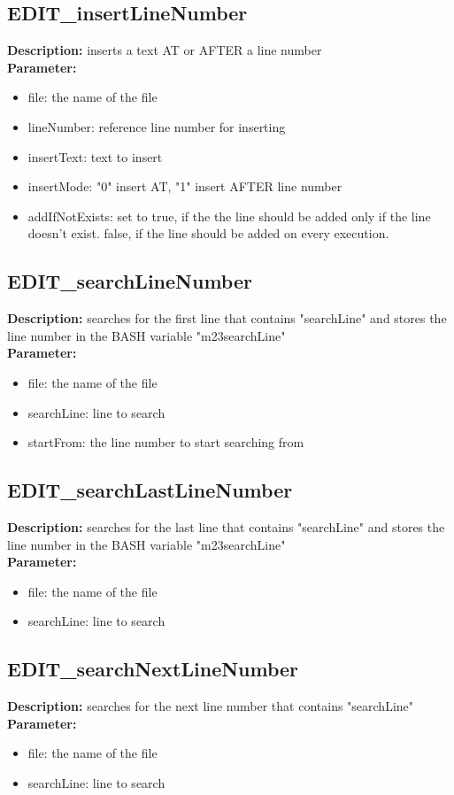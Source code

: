 \subsection{EDIT\_insertLineNumber}
\textbf{Description:} inserts a text AT or AFTER a line number\\
\textbf{Parameter:}
\begin{itemize}
\item file: the name of the file
\item lineNumber: reference line number for inserting
\item insertText: text to insert
\item insertMode: "0" insert AT, "1" insert AFTER line number
\item addIfNotExists: set to true, if the the line should be added only if the line doesn't exist. false, if the line should be added on every execution.
\end{itemize}

\subsection{EDIT\_searchLineNumber}
\textbf{Description:} searches for the first line that contains "searchLine" and stores the line number in the BASH variable "m23searchLine"\\
\textbf{Parameter:}
\begin{itemize}
\item file: the name of the file
\item searchLine: line to search
\item startFrom: the line number to start searching from
\end{itemize}

\subsection{EDIT\_searchLastLineNumber}
\textbf{Description:} searches for the last line that contains "searchLine" and stores the line number in the BASH variable "m23searchLine"\\
\textbf{Parameter:}
\begin{itemize}
\item file: the name of the file
\item searchLine: line to search
\end{itemize}

\subsection{EDIT\_searchNextLineNumber}
\textbf{Description:} searches for the next line number that contains "searchLine"\\
\textbf{Parameter:}
\begin{itemize}
\item file: the name of the file
\item searchLine: line to search
\end{itemize}

